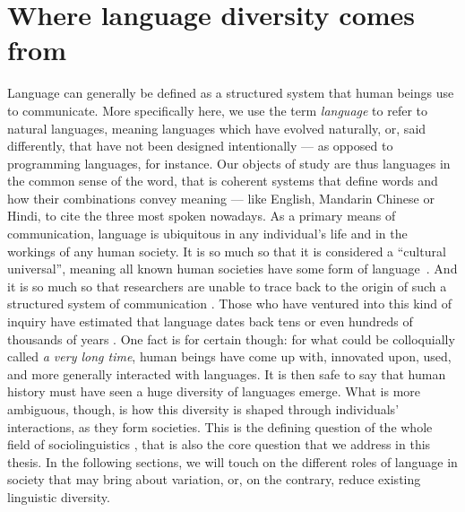 \documentclass[../thesis.tex]{subfiles}
\begin{document}
\chapter{Where language diversity comes from}
\label{ch:lang_as_comm}

Language can generally be defined as
a structured system that human beings use to communicate.
More specifically here, we use the term \emph{language} to refer to natural languages, meaning languages which have evolved naturally, or, said differently, that have not been designed intentionally --- as opposed to programming languages, for instance. Our objects of
study are thus languages in the common sense of the word, that is coherent
systems that define words and how their combinations convey meaning --- like English, Mandarin Chinese or Hindi, to cite the three most spoken nowadays.
As
a primary means of communication, language
is ubiquitous in any individual's life and in the workings of any human
society. It is so much so that it is considered a ``cultural universal'', meaning all
known human societies have some form of
language~\cite{GreenbergLanguageUniversals2020,BrownDonaldHumanUniversals1991,}.
And it
is so much so that researchers are unable to trace back to the origin of such a
structured system of communication
\cite{MullerLectureIX1861,StamInquiriesOrigin1976,GibsonOxfordHandbook2011,HauserMysteryLanguage2014}.
Those who have ventured into this kind of inquiry have estimated that language dates back tens or even hundreds of
thousands of years
\cite{NicholsOriginDispersal1998,ChomskyLanguageMind2004,BothaCradleLanguage2009,DediuAntiquityLanguage2013}.
One fact is for certain though: for what could be colloquially called \emph{a very long
time}, human beings have come up with, innovated upon, used, and more generally
interacted with languages. It is then safe to say that human history must have seen a huge
diversity of languages emerge. What is more ambiguous, though, is how this diversity is
shaped through individuals' interactions, as they form societies. This is the defining question of the whole field of sociolinguistics \cite{LabovSociolinguisticPatterns1973,TrudgillSociolinguisticsIntroduction2000,ChambersSociolinguisticTheory2007,WardhaughIntroductionSociolinguistics2008,LabovPrinciplesLinguistic2001}, that is also the core question that we address in this thesis. In the following sections, we will
touch on the different roles of language in society that may bring about variation, or, on the contrary, reduce existing linguistic diversity.
\end{document}
